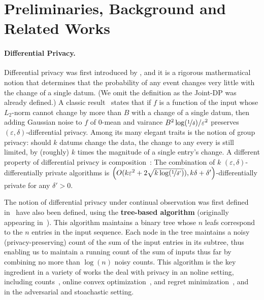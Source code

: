 \documentclass{article}
\begin{document}
\section{Preliminaries, Background and Related Works}
\label{sec:background}

\paragraph{Differential Privacy.} Differential privacy was first introduced by
\citet{DworkCalibratingNoiseSensitivity2006, DworkKenthrapdai...2006}, and it is a rigorous mathermatical notion that determines that the probability of any event changes very little with the change of a single datum. (We omit the definition as the Joint-DP was already defined.) A classic result~\cite{DworkKenthrapdai...2006} states that if $f$ is a function of the input whose $L_2$-norm cannot change by more than $B$ with a change of a single datum, then adding Gaussian noise to $f$ of $0$-mean and vairance $B^2\log(\nicefrac 1 \delta)/\varepsilon^2$ preserves $(\varepsilon,\delta)$-differential privacy. Among its many elegant traits is the notion of group privacy: should $k$ datums change the data, the change to any every is still limited, by (roughly) $k$ times the magnitude of a single entry's change. A different property of differential privacy is composition~\cite{DworkRothblumVadhan2010}: The combination of $k$ $(\varepsilon,\delta)$-differentially private algorithms is $\left( O(k\varepsilon^2 + 2\sqrt{k\log(\nicefrac 1 {\delta'})}), k\delta+\delta'  \right)$-differentially private for any $\delta'>0$.

The notion of differential privacy under continual observation was first defined in~\cite{DworkContinualObservation2010} have also been defined, using the \textbf{tree-based algorithm} (originally appearing in~\cite{ChanPrivateContinualRelease2010}). This algorithm maintains a binary tree whose $n$ leafs correspond to the $n$ entries in the input sequence. Each node in the tree maintains a noisy (privacy-preserving) count of the sum of the input entries in its subtree, thus enabling us to maintain a running count of the sum of inputs thus far by combining no more than $\log(n)$ noisy counts. This algorithm is the key ingredient in a variety of works the deal with privacy in an noline setting, including counts~\cite{DworkContinualObservation2010}, online convex optimization~\cite{Jain,someone,thakurta,colt2012/3}, and regret minimization~\cite{SmithThakurta2013},\cite{MishraNearlyOptimalDPBandits2015} and~\cite{TussouDimitrikakis twice} in the adversarial and stoachastic setting.
\end{document}
